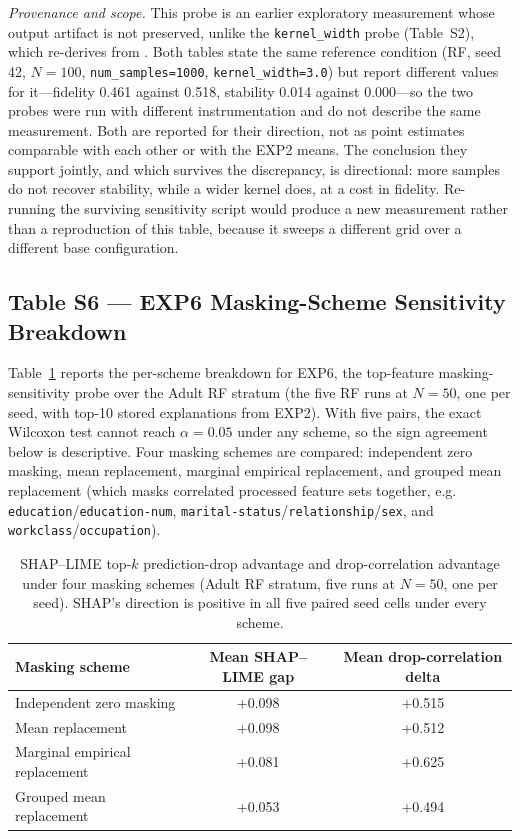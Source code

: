 \noindent\textit{Provenance and scope.} This probe is an earlier exploratory
measurement whose output artifact is not preserved, unlike the
\texttt{kernel\_width} probe (Table~S2), which re-derives from
. Both tables
state the same reference condition (RF, seed 42, $N=100$,
\texttt{num\_samples=1000}, \texttt{kernel\_width=3.0}) but report different
values for it---fidelity 0.461 against 0.518, stability 0.014 against
0.000---so the two probes were run with different instrumentation and do not
describe the same measurement. Both are reported for their direction, not as
point estimates comparable with each other or with the EXP2 means. The
conclusion they support jointly, and which survives the discrepancy, is
directional: more samples do not recover stability, while a wider kernel
does, at a cost in fidelity. Re-running the surviving sensitivity script
would produce a new measurement rather than a reproduction of this table,
because it sweeps a different grid over a different base configuration.

\subsection*{Table S6 --- EXP6 Masking-Scheme Sensitivity Breakdown}
\label{sec:supp_exp6}

Table~\ref{tab:s6_exp6} reports the per-scheme breakdown for EXP6, the
top-feature masking-sensitivity probe over the Adult RF stratum (the five
RF runs at $N=50$, one per seed, with top-10 stored explanations from
EXP2). With five pairs, the exact Wilcoxon test cannot reach
$\alpha = 0.05$ under any scheme, so the sign agreement below is
descriptive. Four masking
schemes are compared: independent zero masking, mean replacement,
marginal empirical replacement, and grouped mean replacement (which masks
correlated processed feature sets together, e.g.
\texttt{education}/\texttt{education-num},
\texttt{marital-status}/\texttt{relationship}/\texttt{sex}, and
\texttt{workclass}/\texttt{occupation}).

\begin{table}[h]
\centering
\caption{SHAP--LIME top-$k$ prediction-drop advantage and drop-correlation
advantage under four masking schemes (Adult RF stratum, five runs at $N=50$,
one per seed). SHAP's direction is positive in all five paired seed cells under
every scheme.}
\label{tab:s6_exp6}
\begin{tabular}{lcc}
\toprule
Masking scheme & Mean SHAP--LIME gap & Mean drop-correlation delta \\
\midrule
Independent zero masking      & +0.098 & +0.515 \\
Mean replacement               & +0.098 & +0.512 \\
Marginal empirical replacement & +0.081 & +0.625 \\
Grouped mean replacement       & +0.053 & +0.494 \\
\bottomrule
\end{tabular}
\end{table}

